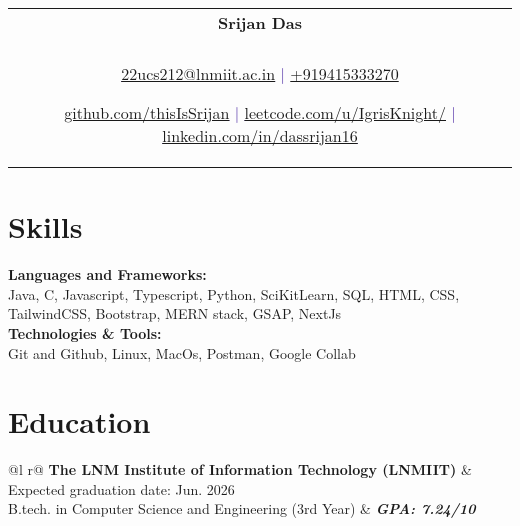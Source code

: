 \documentclass[a4paper,8pt]{article}
\begin{document}
\pagestyle{empty} 


\begin{tabularx}{\linewidth}{@{} C @{}}
\color[HTML]{318CE7} \Huge{\textbf{Srijan Das}} \\[6pt]
\\
\textcolor[HTML]{4B28A4}{\underline{\href{mailto:22ucs212@lnmiit.ac.in}{\raisebox{-0.05\height}{\faEnvelope} 22ucs212@lnmiit.ac.in}} $|$}
\textcolor[HTML]{4B28A4}{\href{tel:+919415333270}{\raisebox{-0.05\height}{\faMobile} +919415333270}}

\textcolor[HTML]{4B28A4}{\underline{\href{https://github.com/thisIsSrijan}{\raisebox{-0.05\height}{\faGithub} github.com/thisIsSrijan}} $|$}
\textcolor[HTML]{4B28A4}{\underline{\href{https://leetcode.com/u/IgrisKnight/}
{\raisebox{-0.05\height}{\faCode} leetcode.com/u/IgrisKnight/}} $|$}
\textcolor[HTML]{4B28A4}{\underline{\href{https://www.linkedin.com/in/dassrijan16/}{\raisebox{-0.05\height}{\faLinkedin} linkedin.com/in/dassrijan16}}}
\end{tabularx}

\color[HTML]{318CE7}\section{\textbf{Skills}}
\color[HTML]{1C033C}\textbf{Languages and Frameworks:} \\[2pt]
\color[HTML]{1C033C} \hspace*{4ex} Java, C, Javascript, Typescript, Python, SciKitLearn, SQL, HTML, CSS, TailwindCSS, Bootstrap, MERN stack, GSAP,\newline \hspace*{4ex} NextJs\\[3pt]
\color[HTML]{1C033C}\textbf{Technologies \& Tools:} \\[2pt]
\color[HTML]{1C033C} \hspace*{4ex} Git and Github, Linux, MacOs, Postman, Google Collab\\[3pt]


\color[HTML]{318CE7}\section{\textbf{Education}}
\begin{tabularx}{\linewidth}{ @{}l r@{} }
\color[HTML]{1C033C} \textbf{The LNM Institute of Information Technology (LNMIIT)} & \hfill \color[HTML]{1C033C} Expected graduation date: Jun. 2026 \\
\color[HTML]{1C033C} B.tech. in Computer Science and Engineering (3rd Year)  & \hfill \color[HTML]{4B28A4} \textit{\textbf{GPA: 7.24/10}} \\
\end{tabularx}
\end{document}
